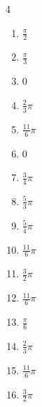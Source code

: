 \begin{multicols}{4}
\begin{enumerate}
\columnbreak %

  \item $\displaystyle \frac{\pi}{2}$

  \item $\displaystyle \frac{\pi}{3}$

  \item $\displaystyle 0$

  \item $\displaystyle \frac{2}{3}\pi$

  \item $\displaystyle \frac{11}{6}\pi$

  \item $\displaystyle 0$

  \item $\displaystyle \frac{3}{4}\pi$

  \item $\displaystyle \frac{5}{3}\pi$

  \item $\displaystyle \frac{5}{4}\pi$

  \item $\displaystyle \frac{11}{6}\pi$

  \item $\displaystyle \frac{3}{2}\pi$

  \item $\displaystyle \frac{11}{6}\pi$

  \item $\displaystyle \frac{\pi}{6}$

  \item $\displaystyle \frac{2}{3}\pi$

  \item $\displaystyle \frac{11}{6}\pi$

  \item $\displaystyle \frac{3}{2}\pi$


\end{enumerate}
\end{multicols}
